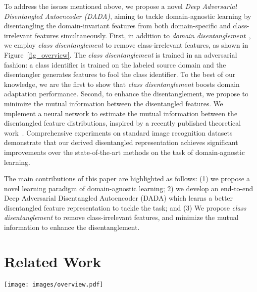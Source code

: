 \documentclass{article}
\begin{document}
To address the issues mentioned above, we propose a novel \textit{Deep Adversarial Disentangled Autoencoder (DADA)}, aiming to tackle domain-agnostic learning by disentangling the domain-invariant features from both domain-specific and class-irrelevant features simultaneously. First, in addition to \textit{domain disentanglement}~\cite{ufdn,dida,drit}, we employ \textit{class disentanglement} to remove class-irrelevant features, as shown in Figure~\ref{fig_overview}. The \textit{class disentanglement} is trained in an adversarial fashion: a class identifier is trained on the labeled source domain and the disentangler generates features to fool the class identifier. To the best of our knowledge, we are the first to show that \textit{class disentanglement} boosts domain adaptation performance. Second, to enhance the disentanglement, we propose to minimize the mutual information between the disentangled features. We implement a neural network to estimate the mutual information between the disentangled feature distributions, inspired by a recently published theoretical work~\cite{mine}.
Comprehensive experiments on standard image recognition datasets demonstrate that our derived disentangled representation achieves significant improvements over the state-of-the-art methods on the task of domain-agnostic learning.

The main contributions of this paper are highlighted as follows: (1) we propose a novel learning paradigm of domain-agnostic learning; 2) we develop an end-to-end Deep Adversarial Disentangled Autoencoder (DADA) which learns a better disentangled feature representation to tackle the task; and (3) We propose \textit{class disentanglement} to remove class-irrelevant features, and minimize the mutual information to enhance the disentanglement.


 \section{Related Work}
\begin{figure*}[t]
    \centering
    \texttt{[image: images/overview.pdf]}
    \vspace{-0.3cm}
    \caption{Our DADA architecture learns to extract \textit{domain-invariant} features of visual categories. In addition to \textit{domain disentanglement} ({\color{blue}blue lines}), we employ \textit{class disentanglement} ({\color{red}red lines}) to remove  \textit{class-irrelevant} features, both trained adversarially. 
    We further apply a mutual information minimizer to strengthen the disentanglement. }
   \vspace{-0.3cm}
    \label{fig_overview}
\end{figure*}
\end{document}
